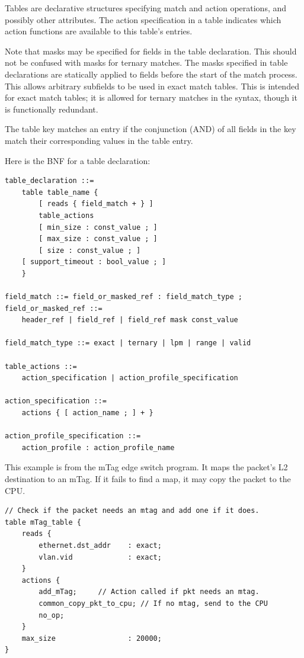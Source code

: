 \documentclass[12pt]{article}
\begin{document}
Tables are declarative structures specifying match and action operations, and
possibly other attributes. The action specification in a table indicates which
action functions are available to this table's entries.

Note that masks may be specified for fields in the table declaration. This 
should not be confused with masks for ternary matches. The masks specified 
in table declarations are statically applied to fields before the start of 
the match process. This allows arbitrary subfields to be used in exact match 
tables. This is intended for exact match tables; it is allowed for ternary 
matches in the syntax, though it is functionally redundant.

The table key matches an entry if the conjunction (AND) of all fields in
the key match their corresponding values in the table entry.

Here is the BNF for a table declaration:

\begin{lstlisting}[style=BNFstyle]
table_declaration ::=
    table table_name {
        [ reads { field_match + } ]
        table_actions
        [ min_size : const_value ; ]
        [ max_size : const_value ; ]
        [ size : const_value ; ]
	[ support_timeout : bool_value ; ]
    }

field_match ::= field_or_masked_ref : field_match_type ;
field_or_masked_ref ::= 
    header_ref | field_ref | field_ref mask const_value

field_match_type ::= exact | ternary | lpm | range | valid

table_actions ::= 
    action_specification | action_profile_specification

action_specification ::= 
    actions { [ action_name ; ] + }

action_profile_specification ::= 
    action_profile : action_profile_name
\end{lstlisting}

This example is from the mTag edge switch program.  It maps the packet's 
L2 destination to an mTag. If it fails to find a map, it may copy the packet 
to the CPU.

\begin{lstlisting}[style=P4style]
// Check if the packet needs an mtag and add one if it does.
table mTag_table {
    reads {
        ethernet.dst_addr    : exact;
        vlan.vid             : exact;
    }
    actions {
        add_mTag;     // Action called if pkt needs an mtag.
        common_copy_pkt_to_cpu; // If no mtag, send to the CPU
        no_op;
    }
    max_size                 : 20000;
}
\end{lstlisting}
\end{document}
